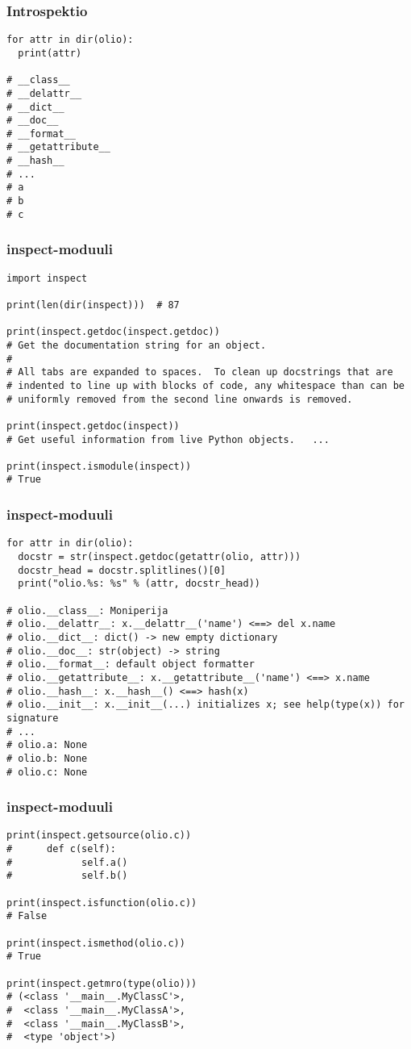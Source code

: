 \documentclass{beamer}
\begin{document}
\begin{frame}[fragile]
\frametitle{Introspektio}
\begin{verbatim}
for attr in dir(olio): 
  print(attr)

# __class__
# __delattr__
# __dict__
# __doc__
# __format__
# __getattribute__
# __hash__
# ...
# a
# b
# c
\end{verbatim}
\end{frame}

\begin{frame}[fragile]
\frametitle{inspect-moduuli}
\begin{verbatim}
import inspect

print(len(dir(inspect)))  # 87

print(inspect.getdoc(inspect.getdoc))
# Get the documentation string for an object.
# 
# All tabs are expanded to spaces.  To clean up docstrings that are
# indented to line up with blocks of code, any whitespace than can be
# uniformly removed from the second line onwards is removed.

print(inspect.getdoc(inspect))
# Get useful information from live Python objects.   ...

print(inspect.ismodule(inspect))
# True

\end{verbatim}
\end{frame}

\begin{frame}[fragile]
\frametitle{inspect-moduuli}
\begin{verbatim}
for attr in dir(olio):
  docstr = str(inspect.getdoc(getattr(olio, attr)))
  docstr_head = docstr.splitlines()[0]
  print("olio.%s: %s" % (attr, docstr_head))

# olio.__class__: Moniperija
# olio.__delattr__: x.__delattr__('name') <==> del x.name
# olio.__dict__: dict() -> new empty dictionary
# olio.__doc__: str(object) -> string
# olio.__format__: default object formatter
# olio.__getattribute__: x.__getattribute__('name') <==> x.name
# olio.__hash__: x.__hash__() <==> hash(x)
# olio.__init__: x.__init__(...) initializes x; see help(type(x)) for signature
# ...
# olio.a: None
# olio.b: None
# olio.c: None

\end{verbatim}
\end{frame}

\begin{frame}[fragile]
\frametitle{inspect-moduuli}
\begin{verbatim}
print(inspect.getsource(olio.c))
#      def c(self):
#            self.a()
#            self.b()

print(inspect.isfunction(olio.c))
# False

print(inspect.ismethod(olio.c))
# True

print(inspect.getmro(type(olio)))
# (<class '__main__.MyClassC'>, 
#  <class '__main__.MyClassA'>, 
#  <class '__main__.MyClassB'>, 
#  <type 'object'>)

\end{verbatim}
\end{frame}
\end{document}
